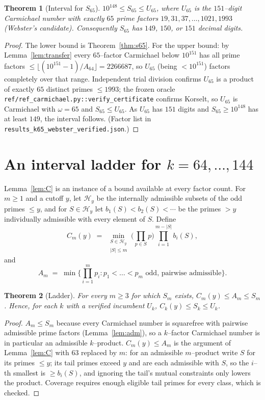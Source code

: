 \documentclass[11pt]{article}
\newtheorem{theorem}{Theorem}
\theoremstyle{definition}
\newcommand{\code}[1]{\texttt{#1}}
\begin{document}
\begin{theorem}[Interval for $S_{65}$]\label{thm:s65interval}
$10^{148}\le S_{65}\le U_{65}$, where $U_{65}$ is the $151$--digit Carmichael number with exactly $65$
prime factors $19,31,37,\dots,1021,1993$ (Webster's candidate). Consequently $S_{65}$ has $149$,
$150$, or $151$ decimal digits.
\end{theorem}

\begin{proof}
The lower bound is Theorem~\ref{thm:s65}. For the upper bound: by Lemma~\ref{lem:transfer} every
$65$--factor Carmichael below $10^{151}$ has all prime factors $\le\lfloor(10^{151}-1)/A_{64}\rfloor=
2266687$, so $U_{65}$ (being $<10^{151}$) factors completely over that range. Independent trial
division confirms $U_{65}$ is a product of exactly $65$ distinct primes $\le 1993$; the frozen oracle
\code{ref/ref\_carmichael.py::verify\_certificate} confirms Korselt, so $U_{65}$ is Carmichael with
$\omega=65$ and $S_{65}\le U_{65}$. As $U_{65}$ has $151$ digits and $S_{65}\ge10^{148}$ has at least
$149$, the interval follows. (Factor list in \code{results\_k65\_webster\_verified.json}.)
\end{proof}

\section{An interval ladder for $k=64,\dots,144$}\label{sec:ladder}

Lemma~\ref{lem:C} is an instance of a bound available at every factor count. For $m\ge1$ and a
cutoff $y$, let $\mathcal H_y$ be the internally admissible subsets of the odd primes $\le y$, and for
$S\in\mathcal H_y$ let $b_1(S)<b_2(S)<\cdots$ be the primes $>y$ individually admissible with every
element of $S$. Define
\[
  C_m(y)\;=\;\min_{\substack{S\in\mathcal H_y\\ |S|\le m}}
  \Big(\prod_{p\in S}p\Big)\prod_{i=1}^{m-|S|} b_i(S),
\]
and
\[
  A_m\;=\;\min\Big\{\prod_{i=1}^{m}p_i : p_1<\dots<p_m\text{ odd, pairwise admissible}\Big\}.
\]

\begin{theorem}[Ladder]\label{thm:ladder}
For every $m\ge3$ for which $S_m$ exists, $C_m(y)\le A_m\le S_m$. Hence, for each $k$ with a verified incumbent $U_k$,
$C_k(y)\le S_k\le U_k$.
\end{theorem}

\begin{proof}
$A_m\le S_m$ because every Carmichael number is squarefree with pairwise admissible prime factors
(Lemma~\ref{lem:adm}), so a $k$--factor Carmichael number is in particular an admissible
$k$--product. $C_m(y)\le A_m$ is the argument of Lemma~\ref{lem:C} with $63$ replaced by $m$: for an
admissible $m$--product write $S$ for its primes $\le y$; its tail primes exceed $y$ and are each
admissible with $S$, so the $i$--th smallest is $\ge b_i(S)$, and ignoring the tail's mutual
constraints only lowers the product. Coverage requires enough eligible tail primes for every class,
which is checked.
\end{proof}
\end{document}
